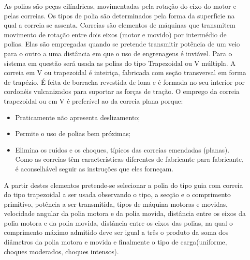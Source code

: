     As polias são peças cilíndricas, movimentadas pela rotação do eixo do motor e pelas correias. Os tipos de polia são 
    determinados pela forma da superfície na qual a correia se assenta.
Correias são elementos de máquinas que transmitem movimento de rotação entre dois eixos (motor e movido) por intermédio de polias. 
Elas são empregadas quando se pretende transmitir potência de um veio para o outro a uma distância em que o uso de engrenagens é 
inviável.
Para o sistema em questão será usada as polias do tipo Trapezoidal ou V múltipla. A correia em V ou trapezoidal é inteiriça, 
fabricada com seção transversal em forma de trapézio. É feita de borracha revestida de lona e é formada no seu interior por 
cordonéis vulcanizados para suportar as forças de tração.
O emprego da correia trapezoidal ou em V é preferível ao da correia plana porque:

\begin{itemize}
  \item Praticamente não apresenta deslizamento;
  \item Permite o uso de polias bem próximas;
  \item Elimina os ruídos e os choques, típicos das correias emendadas (planas). Como as correias têm características 
  diferentes de fabricante para fabricante, é aconselhável seguir as instruções que eles forneçam.
\end{itemize}

  A partir destes elementos pretende-se selecionar a polia do tipo guia com correia do tipo trapezoidal a ser usada observando o 
  tipo, a secção e o comprimento primitivo, potência a ser transmitida, tipos de máquina motoras e  movidas, velocidade angular da
  polia motora e da polia movida, distância entre os eixos da polia motora e da polia movida, distância entre os eixos das polias, 
  na qual o comprimento máximo admitido deve ser igual a três o produto da soma dos diâmetros da polia motora e movida e finalmente 
  o tipo de carga(uniforme, choques moderados, choques intensos).

